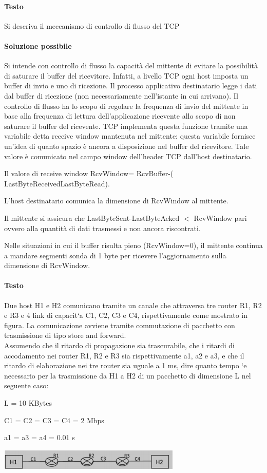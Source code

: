 \documentclass[10pt]{article}
\begin{document}
\paragraph{Testo} Si descriva il meccanismo di controllo di flusso del TCP
\paragraph{Soluzione possibile}  Si intende con controllo di flusso la capacità del mittente di evitare la possibilità di saturare il buffer del ricevitore. Infatti, a livello TCP ogni host imposta un buffer di invio e uno di ricezione. Il processo applicativo destinatario legge i dati dal buffer di ricezione (non necessariamente nell’istante in cui arrivano). Il controllo di flusso ha lo scopo di regolare la frequenza di invio del mittente in base alla frequenza di lettura dell’applicazione ricevente allo scopo di non saturare il buffer del ricevente. TCP implementa questa funzione tramite una variabile detta receive window mantenuta nel mittente: questa variabile fornisce un’idea di quanto spazio è ancora a disposizione nel buffer del ricevitore. Tale valore è comunicato nel campo window dell’header TCP dall’host destinatario.
\begin{list}{}{}
\item Il valore di receive window RcvWindow= RcvBuffer-( LastByteReceivedLastByteRead).
\item L’host destinatario comunica la dimensione di RcvWindow al mittente.
\item Il mittente si assicura che LastByteSent-LastByteAcked $<$ RcvWindow pari ovvero alla quantità di dati trasmessi e non ancora riscontrati.
\end{list}
Nelle situazioni in cui il buffer risulta pieno (RcvWindow=0), il mittente continua a mandare segmenti sonda di 1 byte per ricevere l’aggiornamento sulla dimensione di RcvWindow.
\paragraph{Testo}  Due host H1 e H2 comunicano tramite un canale che attraversa tre router R1, R2 e R3 e 4 link di capacit`a C1, C2, C3 e C4, rispettivamente come mostrato in figura. La comunicazione avviene tramite commutazione di pacchetto con trasmissione di tipo store and forward.\\
Assumendo che il ritardo di propagazione sia trascurabile, che i ritardi di accodamento nei router R1, R2 e R3 sia rispettivamente a1, a2 e a3, e che il ritardo di elaborazione nei tre router sia uguale a 1 ms, dire quanto tempo `e necessario per la trasmissione da H1 a H2 di un pacchetto di dimensione L nel seguente caso:
\begin{list}{-}{}
\item L = 10 KBytes
\item C1 = C2 = C3 = C4 = 2 Mbps
\item a1 = a3 = a4 = 0.01 s
\end{list}
\begin{center}
\includegraphics[scale=1]{es_tcp6testo.png}
\end{center}
\end{document}
